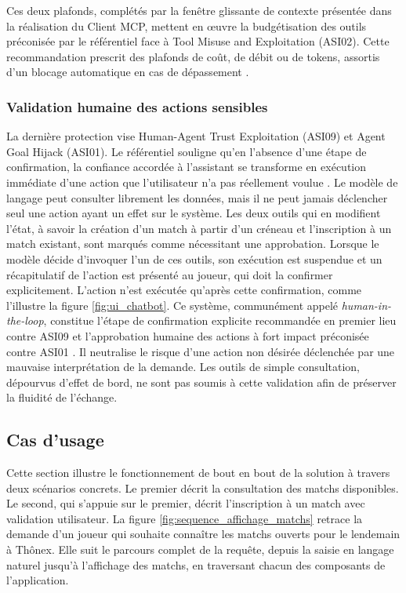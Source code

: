 \documentclass[12pt]{article}
\begin{document}
\newline\newline
Ces deux plafonds, complétés par la fenêtre glissante de contexte présentée dans la réalisation du Client MCP, mettent en œuvre la budgétisation des outils préconisée par le référentiel face à Tool Misuse and Exploitation (ASI02). Cette recommandation prescrit des plafonds de coût, de débit ou de tokens, assortis d'un blocage automatique en cas de dépassement \parencite[p~14]{owasp_owasp_2025}.

\subsubsection{Validation humaine des actions sensibles}
La dernière protection vise Human-Agent Trust Exploitation (ASI09) et Agent Goal Hijack (ASI01). Le référentiel souligne qu'en l'absence d'une étape de confirmation, la confiance accordée à l'assistant se transforme en exécution immédiate d'une action que l'utilisateur n'a pas réellement voulue \parencite[p~33]{owasp_owasp_2025}. Le modèle de langage peut consulter librement les données, mais il ne peut jamais déclencher seul une action ayant un effet sur le système. Les deux outils qui en modifient l'état, à savoir la création d'un match à partir d'un créneau et l'inscription à un match existant, sont marqués comme nécessitant une approbation. Lorsque le modèle décide d'invoquer l'un de ces outils, son exécution est suspendue et un récapitulatif de l'action est présenté au joueur, qui doit la confirmer explicitement. L'action n'est exécutée qu'après cette confirmation, comme l'illustre la figure \ref{fig:ui_chatbot}.
\newline\newline
Ce système, communément appelé \textit{human-in-the-loop}, constitue l'étape de confirmation explicite recommandée en premier lieu contre ASI09 \parencite[p~34]{owasp_owasp_2025} et l'approbation humaine des actions à fort impact préconisée contre ASI01 \parencite[p~10]{owasp_owasp_2025}. Il neutralise le risque d'une action non désirée déclenchée par une mauvaise interprétation de la demande. Les outils de simple consultation, dépourvus d'effet de bord, ne sont pas soumis à cette validation afin de préserver la fluidité de l'échange.

\subsection{Cas d'usage}
Cette section illustre le fonctionnement de bout en bout de la solution à travers deux scénarios concrets. Le premier décrit la consultation des matchs disponibles. Le second, qui s'appuie sur le premier, décrit l'inscription à un match avec validation utilisateur.
\newline\newline
La figure \ref{fig:sequence_affichage_matchs} retrace la demande d'un joueur qui souhaite connaître les matchs ouverts pour le lendemain à Thônex. Elle suit le parcours complet de la requête, depuis la saisie en langage naturel jusqu'à l'affichage des matchs, en traversant chacun des composants de l'application.
\end{document}
